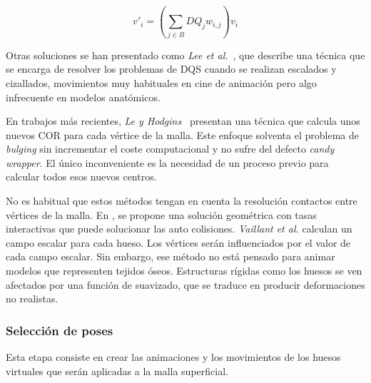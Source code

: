 \begin{equation}
\label{eqn:DQS}
v'_{i} = (\sum_{j \in B} DQ_{j}w_{i,j}) v_{i}
\end{equation}

Otras soluciones se han presentado como \emph{Lee et al.}~\cite{Lee2013}, que describe una técnica que se encarga de resolver los problemas de \ac{DQS} cuando se realizan escalados y cizallados, movimientos muy habituales en cine de animación pero algo infrecuente en modelos anatómicos.

En trabajos más recientes, \emph{Le y Hodgins}~\cite{le2016real} presentan una técnica que calcula unos nuevos \acl{COR} para cada vértice de la malla. Este enfoque solventa el problema de \emph{bulging} sin incrementar el coste computacional y no sufre del defecto \emph{candy wrapper}. El único inconveniente es la necesidad de un proceso previo para calcular todos esos nuevos centros.


%
%
No es habitual que estos métodos tengan en cuenta la resolución contactos entre vértices de la malla. En \cite{Vaillant:2014}, se propone una solución geométrica con tasas interactivas que puede solucionar las auto colisiones. \emph{Vaillant et al.} calculan un campo escalar para cada hueso. Los vértices serán influenciados por el valor de cada campo escalar. Sin embargo, ese método no está pensado para animar modelos que representen tejidos óseos. Estructuras rígidas como los huesos se ven afectados por una función de suavizado, que se traduce en producir deformaciones no realistas. %



\subsubsection{Selección de poses} 
\label{art:poses}
Esta etapa consiste en crear las animaciones  y los movimientos de los huesos virtuales que serán aplicadas a la malla superficial.   

